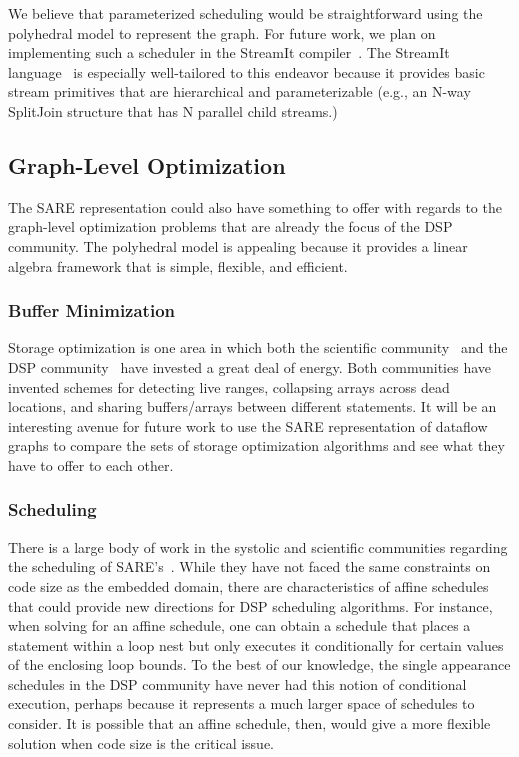 We believe that parameterized scheduling would be straightforward
using the polyhedral model to represent the graph.  For future work,
we plan on implementing such a scheduler in the StreamIt
compiler~\cite{Gordo02}.  The StreamIt language~\cite{streamitcc} is
especially well-tailored to this endeavor because it provides basic
stream primitives that are hierarchical and parameterizable (e.g., an
N-way SplitJoin structure that has N parallel child streams.)

\subsection{Graph-Level Optimization}

The SARE representation could also have something to offer with
regards to the graph-level optimization problems that are already the
focus of the DSP community.  The polyhedral model is appealing because
it provides a linear algebra framework that is simple, flexible, and
efficient.

\subsubsection{Buffer Minimization}

Storage optimization is one area in which both the scientific
community~\cite{Lim01,Quillere,Thies01,Lefebvre98} and the DSP
community~\cite{murt1997x1,GGD94,murt2001x1} have invested a great
deal of energy.  Both communities have invented schemes for detecting
live ranges, collapsing arrays across dead locations, and sharing
buffers/arrays between different statements.  It will be an
interesting avenue for future work to use the SARE representation of
dataflow graphs to compare the sets of storage optimization algorithms
and see what they have to offer to each other.

\subsubsection{Scheduling}

There is a large body of work in the systolic and scientific
communities regarding the scheduling of SARE's~\cite{DRV00}.  While
they have not faced the same constraints on code size as the embedded
domain, there are characteristics of affine schedules that could
provide new directions for DSP scheduling algorithms.  For instance,
when solving for an affine schedule, one can obtain a schedule that
places a statement within a loop nest but only executes it
conditionally for certain values of the enclosing loop bounds.  To the
best of our knowledge, the single appearance schedules in the DSP
community have never had this notion of conditional execution, perhaps
because it represents a much larger space of schedules to consider.
It is possible that an affine schedule, then, would give a more
flexible solution when code size is the critical issue.

